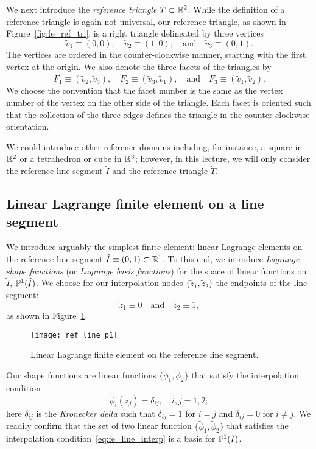   
We next introduce the \emph{reference triangle} $\tilde T \subset \mathbb{R}^2$. While the definition of a reference triangle is again not universal, our reference triangle, as shown in Figure~\ref{fig:fe_ref_tri}, is a right triangle delineated by three vertices
\begin{equation*}
  \tilde v_1 \equiv (0,0), \quad \tilde v_2 \equiv (1,0), \quad \text{and} \quad \tilde v_3 \equiv (0,1).
\end{equation*}
The vertices are ordered in the counter-clockwise manner, starting with the first vertex at the origin. We also denote the three facets of the triangles by
\begin{equation*}
  \tilde F_1 \equiv ( \tilde v_2, \tilde v_3), \quad  \tilde F_2 \equiv ( \tilde v_3, \tilde v_1), \quad \text{and} \quad  \tilde F_3 \equiv ( \tilde v_1, \tilde v_2).
\end{equation*}
We choose the convention that the facet number is the same as the vertex number of the vertex on the other side of the triangle. Each facet is oriented such that the collection of the three edges defines the triangle in the counter-clockwise orientation.  

We could introduce other reference domains including, for instance, a square in $\mathbb{R}^2$ or a tetrahedron or cube in $\mathbb{R}^3$; however, in this lecture, we will only consider the reference line segment $\tilde I$ and the reference triangle $\tilde T$.  

\subsection{Linear Lagrange finite element on a line segment}
\label{sec:fe_lin_line}
We introduce arguably the simplest finite element: linear Lagrange elements on the reference line segment $\tilde I \equiv (0,1) \subset \mathbb{R}^1$.  To this end, we introduce \emph{Lagrange shape functions} (or \emph{Lagrange basis functions}) for the space of linear functions on $\tilde I$, $\mathbb{P}^1(\tilde I)$.
We choose for our interpolation nodes $\{\tilde z_1, \tilde z_2\}$ the endpoints of the line segment:
\begin{equation*}
  \tilde z_1 \equiv 0 \quad \text{and} \quad \tilde z_2 \equiv 1,
\end{equation*}
as shown in Figure~\ref{fig:fe_ref_line_p1}.
  \begin{figure}
    \centering
    \texttt{[image: ref\_line\_p1]}
    \caption{Linear Lagrange finite element on the reference line segment.}
    \label{fig:fe_ref_line_p1}
\end{figure}
Our shape functions are linear functions $\{\tilde \phi_1, \tilde \phi_2\}$ that satisfy the interpolation condition
\begin{equation}
  \tilde \phi_i(z_j) = \delta_{ij}, \quad i,j = 1,2;  \label{eq:fe_line_interp}
\end{equation}
here $\delta_{ij}$ is the \emph{Kronecker delta} such that $\delta_{ij} = 1$ for $i = j$ and $\delta_{ij} = 0$ for $i \neq j$. We readily confirm that the set of two linear function $\{\tilde \phi_1,\tilde \phi_2\}$ that satisfies the interpolation condition~\eqref{eq:fe_line_interp} is a basis for $\mathbb{P}^1(\tilde I)$.

